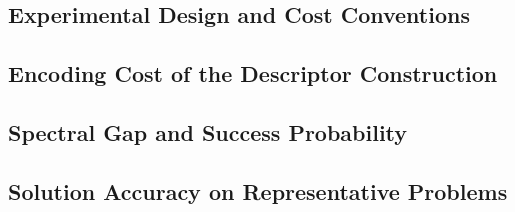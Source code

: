 %
%

\subsection{Experimental Design and Cost Conventions}

\subsection{Encoding Cost of the Descriptor Construction}

\subsection{Spectral Gap and Success Probability}

\subsection{Solution Accuracy on Representative Problems}


